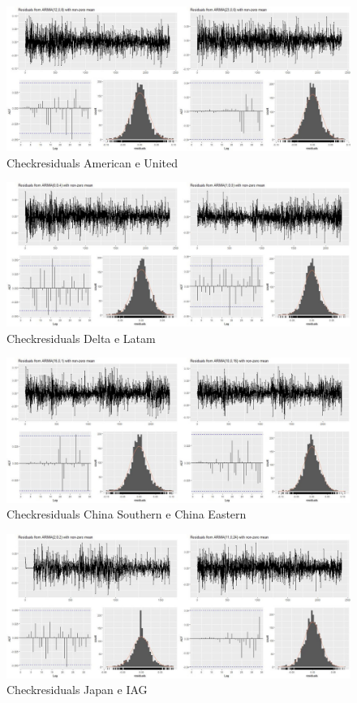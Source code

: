 \documentclass[12pt]{article}
\begin{document}
\begin{figure}[H]
	\centering
	\includegraphics[width=1.0\linewidth]{../Modelos/ResidualsAmericanUnited}
	\caption{Checkresiduals American e United}
	\label{fig:residualsamericanunited}
\end{figure}
\begin{figure}[H]
	\centering
	\includegraphics[width=1.0\linewidth]{../Modelos/ResidualsDeltaLatam}
	\caption{Checkresiduals Delta e Latam}
	\label{fig:residualsdeltalatam}
\end{figure}
\begin{figure}[H]
	\centering
	\includegraphics[width=1.0\linewidth]{../Modelos/ResidualsChinaSouEast}
	\caption{Checkresiduals China Southern e China Eastern}
	\label{fig:residualschinasoueast}
\end{figure}
\begin{figure}[H]
	\centering
	\includegraphics[width=1.0\linewidth]{../Modelos/ResidualsJapanIAG}
	\caption{Checkresiduals Japan e IAG}
	\label{fig:residualsjapaniag}
\end{figure}
\end{document}
